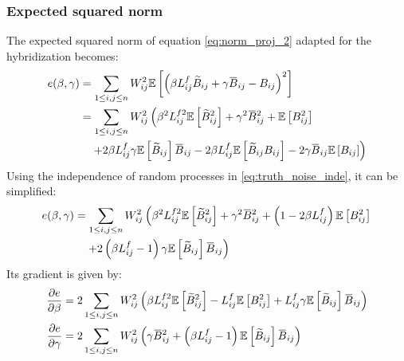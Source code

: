\documentclass[12pt]{scrartcl}
\newcommand{\overbar}[1]{\mkern 1.5mu\overline{\mkern-1.5mu#1\mkern-1.5mu}\mkern 1.5mu}
\begin{document}
\subsubsection{Expected squared norm}
The expected squared norm of equation \eqref{eq:norm_proj_2} adapted for the hybridization becomes:
\begin{align}
e(\beta,\gamma) & = \sum_{1 \le i,j \le n} W_{ij}^2 \mathbb{E}\left[ \left(\beta L^f_{ij} \widetilde{B}_{ij} + \gamma \overbar{B}_{ij} - B_{ij} \right)^2 \right] \nonumber \\
& = \sum_{1 \le i,j \le n} W_{ij}^2 \left(\beta^2 L^{f2}_{ij} \mathbb{E} \left[\widetilde{B}_{ij}^2\right] + \gamma^2 \overbar{B}_{ij}^2 + \mathbb{E} \left[B^2_{ij}\right] \right. \nonumber \\
& \left. \quad + 2 \beta L^f_{ij} \gamma \mathbb{E} \left[\widetilde{B}_{ij}\right] \overbar{B}_{ij} - 2 \beta L^f_{ij} \mathbb{E} \left[\widetilde{B}_{ij} B_{ij}\right] - 2 \gamma \overbar{B}_{ij} \mathbb{E} \left[B_{ij}\right] \right)
\end{align}
Using the independence of random processes in \eqref{eq:truth_noise_inde}, it can be simplified:
\begin{align}
e(\beta,\gamma) & = \sum_{1 \le i,j \le n} W_{ij}^2 \left(\beta^2 L^{f2}_{ij} \mathbb{E} \left[\widetilde{B}_{ij}^2\right] + \gamma^2 \overbar{B}_{ij}^2 + \left(1 - 2 \beta L^f_{ij}\right) \mathbb{E} \left[B^2_{ij}\right] \right. \nonumber \\
& \left. \quad + 2 \left(\beta L^f_{ij} - 1\right) \gamma \mathbb{E} \left[\widetilde{B}_{ij}\right] \overbar{B}_{ij} \right)
\end{align}
Its gradient is given by:
\begin{subequations}
\begin{align}
\frac{\partial e}{\partial \beta} & = 2 \sum_{1 \le i,j \le n} W_{ij}^2 \left(\beta L^{f2}_{ij} \mathbb{E} \left[\widetilde{B}_{ij}^2\right] - L^f_{ij} \mathbb{E} \left[B^2_{ij}\right] + L^f_{ij} \gamma \mathbb{E} \left[\widetilde{B}_{ij}\right] \overbar{B}_{ij} \right) \\
\frac{\partial e}{\partial \gamma} & = 2 \sum_{1 \le i,j \le n} W_{ij}^2 \left(\gamma \overbar{B}_{ij}^2 + \left(\beta L^f_{ij} - 1\right) \mathbb{E} \left[\widetilde{B}_{ij}\right] \overbar{B}_{ij} \right)
\end{align}
\end{subequations}
\end{document}
